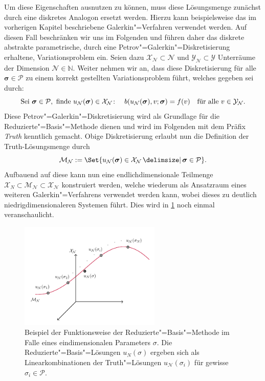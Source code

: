 \documentclass[../main.tex]{subfiles}
\begin{document}
Um diese Eigenschaften ausnutzen zu können, muss diese Lösungsmenge zunächst durch eine diskretes Analogon ersetzt werden.
Hierzu kann beispielsweise das im vorherigen Kapitel beschriebene Galerkin"=Verfahren verwendet werden.
Auf diesen Fall beschränken wir uns im Folgenden und führen daher das diskrete abstrakte parametrische, durch eine Petrov"=Galerkin"=Diskretisierung erhaltene, Variationsproblem ein.
Seien dazu $\mathcal X_{\mathcal N} \subset \mathcal N$ und $\mathcal Y_{\mathcal N} \subset \mathcal Y$ Unterräume der Dimension $\mathcal N \in \mathbb{N}$.
Weiter nehmen wir an, dass diese Diskretisierung für alle $\bm \sigma \in \mathcal P$ zu einem korrekt gestellten Variationsproblem führt, welches gegeben sei durch:
\begin{equation}
\label{eq:diskretes_abstraktes_parametrisches_vp}
    \text{Sei } \bm \sigma \in \mathcal P, \text{ finde } u_{\mathcal N}(\bm \sigma) \in \mathcal X_{\mathcal N} \colon \quad b(u_{\mathcal N}(\bm \sigma), v; \bm \sigma) = f(v) \quad \fa v \in \mathcal Y_{\mathcal N}.
\end{equation}
Diese Petrov"=Galerkin"=Diskretisierung wird als Grundlage für die Reduzierte"=Basis"=Methode dienen und wird im Folgenden mit dem Präfix \emph{Truth} kenntlich gemacht.
Obige Diskretisierung erlaubt nun die Definition der Truth-Lösungsmenge durch
\begin{equation}
\label{eq:truth_loesungsmenge}
    \mathcal M_{\mathcal N} := \Set{u_{\mathcal N}(\bm \sigma) \in \mathcal X_{\mathcal N} \given \bm \sigma \in \mathcal P}.
\end{equation}
Aufbauend auf diese kann nun eine endlichdimensionale Teilmenge $\mathcal X_{N} \subset \mathcal M_{\mathcal N} \subset \mathcal X_{\mathcal N}$ konstruiert werden, welche wiederum als Ansatzraum eines weiteren Galerkin"=Verfahrens verwendet werden kann,
wobei dieses zu deutlich niedrigdimensionaleren Systemen führt.
Dies wird in \cref{figure:rbm_loesungsmenge} noch einmal veranschaulicht.

\begin{figure}[tb]
    \centering
    \includegraphics[width=0.6\textwidth]{figures/rb.pdf}
    \caption[%
    Skizze zur Motivation der Reduzierte-Basis-Methode.
    ]{
        Beispiel der Funktionsweise der Reduzierte"=Basis"=Methode im Falle eines eindimensionalen Parameters $\sigma$.
        Die Reduzierte"=Basis"=Lösungen $u_{N}(\sigma)$ ergeben sich als Linearkombinationen der Truth"=Lösungen $u_{\mathcal N}(\sigma_{i})$ für gewisse $\sigma_{i} \in \mathcal P$.
        }
    \label{figure:rbm_loesungsmenge}
\end{figure}
\end{document}
